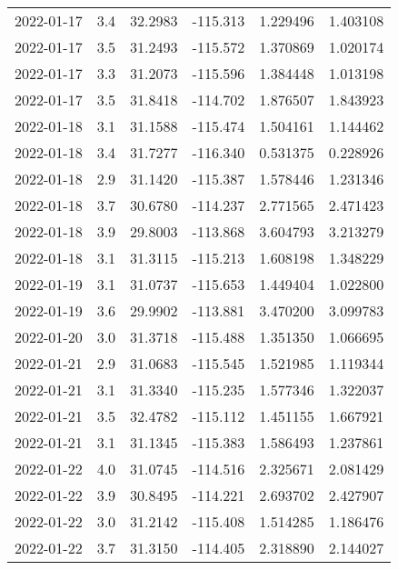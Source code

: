 \begin{tabular}{lrrrrr}
2022-01-17 &       3.4 &  32.2983 &  -115.313 &         1.229496 &         1.403108 \\
2022-01-17 &       3.5 &  31.2493 &  -115.572 &         1.370869 &         1.020174 \\
2022-01-17 &       3.3 &  31.2073 &  -115.596 &         1.384448 &         1.013198 \\
2022-01-17 &       3.5 &  31.8418 &  -114.702 &         1.876507 &         1.843923 \\
2022-01-18 &       3.1 &  31.1588 &  -115.474 &         1.504161 &         1.144462 \\
2022-01-18 &       3.4 &  31.7277 &  -116.340 &         0.531375 &         0.228926 \\
2022-01-18 &       2.9 &  31.1420 &  -115.387 &         1.578446 &         1.231346 \\
2022-01-18 &       3.7 &  30.6780 &  -114.237 &         2.771565 &         2.471423 \\
2022-01-18 &       3.9 &  29.8003 &  -113.868 &         3.604793 &         3.213279 \\
2022-01-18 &       3.1 &  31.3115 &  -115.213 &         1.608198 &         1.348229 \\
2022-01-19 &       3.1 &  31.0737 &  -115.653 &         1.449404 &         1.022800 \\
2022-01-19 &       3.6 &  29.9902 &  -113.881 &         3.470200 &         3.099783 \\
2022-01-20 &       3.0 &  31.3718 &  -115.488 &         1.351350 &         1.066695 \\
2022-01-21 &       2.9 &  31.0683 &  -115.545 &         1.521985 &         1.119344 \\
2022-01-21 &       3.1 &  31.3340 &  -115.235 &         1.577346 &         1.322037 \\
2022-01-21 &       3.5 &  32.4782 &  -115.112 &         1.451155 &         1.667921 \\
2022-01-21 &       3.1 &  31.1345 &  -115.383 &         1.586493 &         1.237861 \\
2022-01-22 &       4.0 &  31.0745 &  -114.516 &         2.325671 &         2.081429 \\
2022-01-22 &       3.9 &  30.8495 &  -114.221 &         2.693702 &         2.427907 \\
2022-01-22 &       3.0 &  31.2142 &  -115.408 &         1.514285 &         1.186476 \\
2022-01-22 &       3.7 &  31.3150 &  -114.405 &         2.318890 &         2.144027 \\

\end{tabular}
